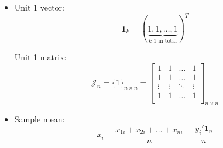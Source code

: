     \begin{itemize}[topsep=6pt,itemsep=4pt]
        \item Unit 1 vector:
        \begin{equation}
            \mathbf{1}_k=(\underbrace{1,1,\ldots,1}_{k\text{ 1 in total}})^T
        \end{equation}

        Unit 1 matrix:
        \begin{equation}\label{EqaAllOneMatrix}
            \mathcal{J}_n  = \{1\}_{n\times n}=\begin{bmatrix}
            1&1&\ldots&1\\
            1&1&\ldots&1\\
            \vdots&\vdots&\ddots&\vdots\\
            1&1&\ldots&1\\
            \end{bmatrix}_{n\times n}
        \end{equation}
        

        \item Sample mean:
        \begin{equation}
            \bar{x}_i=\dfrac{x_{1i}+x_{2i}+\ldots+x_{ni}}{n}=\dfrac{y_i'\mathbf{1}_n}{n}
        \end{equation}
        

\end{itemize}
